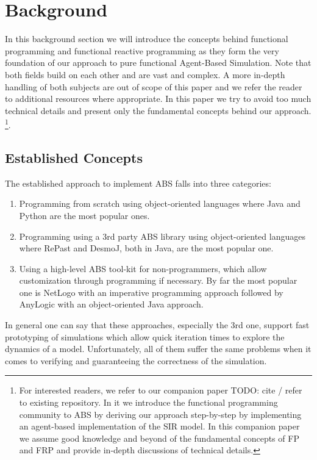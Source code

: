 \section{Background}
In this background section we will introduce the concepts behind functional programming and functional reactive programming as they form the very foundation of our approach to pure functional Agent-Based Simulation. Note that both fields build on each other and are vast and complex. A more in-depth handling of both subjects are out of scope of this paper and we refer the reader to additional resources where appropriate. In this paper we try to avoid too much technical details and present only the fundamental concepts behind our approach. \footnote{For interested readers, we refer to our companion paper TODO: cite / refer to existing repository. In it we introduce the functional programming community to ABS by deriving our approach step-by-step by implementing an agent-based implementation of the SIR model. In this companion paper we assume good knowledge and beyond of the fundamental concepts of FP and FRP and provide in-depth discussions of technical details.}.

\subsection{Established Concepts}
The established approach to implement ABS falls into three categories:
\begin{enumerate}
	\item Programming from scratch using object-oriented languages where Java and Python are the most popular ones.
	\item Programming using a 3rd party ABS library using object-oriented languages where RePast and DesmoJ, both in Java, are the most popular one.
	\item Using a high-level ABS tool-kit for non-programmers, which allow customization through programming if necessary. By far the most popular one is NetLogo with an imperative programming approach followed by AnyLogic with an object-oriented Java approach.
\end{enumerate}

In general one can say that these approaches, especially the 3rd one, support fast prototyping of simulations which allow quick iteration times to explore the dynamics of a model. Unfortunately, all of them suffer the same problems when it comes to verifying and guaranteeing the correctness of the simulation.

